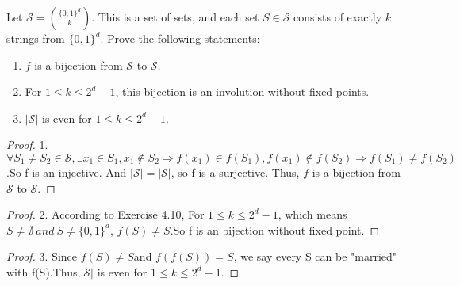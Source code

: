 \begin{exercise}
   Let $\mathcal{S} = { \{0,1\}^d \choose k }$. This is a set of sets, and each set $S \in \mathcal{S}$
   consists of exactly $k$ strings from $\{0,1\}^d$. Prove the following statements: 
   \begin{enumerate}
   \item $f$ is a bijection from $\mathcal{S}$ to $\mathcal{S}$.
   \item For $1 \leq k \leq 2^d-1$, this bijection is an involution
   without fixed points.
   \item $|\mathcal{S}|$ is even for $1 \leq k \leq 2^d-1$.
   \end{enumerate}
\end{exercise}

\begin{proof}
1. $\forall S_1 \neq S_2 \in \mathcal{S}, \exists x_1\in S_1, x_1 \notin S_2 \Rightarrow f(x_1)\in f(S_1),f(x_1)\notin f(S_2) \Rightarrow f(S_1)\neq f(S_2)$.So f is an injective. And $|\mathcal{S}|=|\mathcal{S}|$, so f is a surjective. Thus, $f$ is a bijection from $\mathcal{S}$ to $\mathcal{S}$.
\end{proof}

\begin{proof}
2. According to Exercise 4.10, For $1 \leq k \leq 2^d-1$, which means $S \neq \emptyset \: and\: S \neq \{0,1\}^d$, $f(S) \neq S$.So f is an bijection without fixed point.
\end{proof}

\begin{proof}
3. Since $f(S)\neq S$and $f(f(S))=S$, we say every S can be "married" with f(S).Thus,$|\mathcal{S}|$ is even for $1 \leq k \leq 2^d-1$.
\end{proof}

